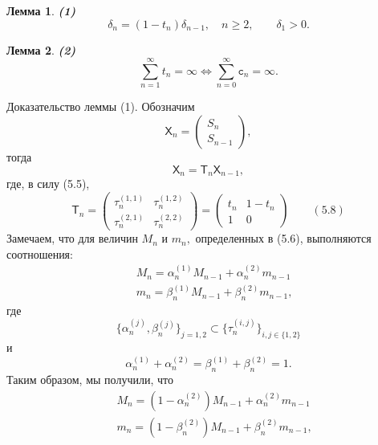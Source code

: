 \documentclass[12 pt, a4 paper]{article}
\theoremstyle{plain}   \newtheorem{Pro}{Задача}
\newtheorem{Lem}{Лемма}
\begin{document}
\begin{Lem}
{\bfseries (1)}
$$
  \delta _n =(1-t_n )\delta _{n-1},
   \quad n \geqslant 2, \qquad \delta _1 >0.
$$
\end{Lem}
\begin{Lem}
{\bfseries (2)}
$$
  \sum _{n=1}^{\infty}t_n =\infty
    \Longleftrightarrow
	  \sum _{n=0}^{\infty} \mathtt{c}_n =\infty .
$$
\end{Lem}
{\Large Доказательство леммы (1).}
Обозначим
\begin{equation*}
  \mathsf{X}_n=
    \begin{pmatrix}
	  S_n \\
	  S_{n-1}
	\end{pmatrix}
 ,
\end{equation*}
тогда
\begin{equation*}
  \mathsf{X}_n =\mathsf{T}_n \mathsf{X}_{n-1},
\end{equation*}
где, в силу (5.5),
\begin{equation*}
  \mathsf{T}_n =
    \begin{pmatrix}
	  \tau _n ^{(1,1)} & \tau _n ^{(1,2)} \\
	  \tau _n ^{(2,1)} & \tau _n ^{(2,2)}
	\end{pmatrix}
  =
    \begin{pmatrix}
	  t_n & 1-t_n \\
	  1 & 0
	\end{pmatrix}
  \qquad (5.8)
\end{equation*}
Замечаем, что для величин
$ M_n $
и
$ m_n , $
определенных в (5.6), выполняются соотношения:
\begin{align*}
  \; & M_n = \alpha _n ^{(1)} M_{n-1}+
    \alpha _n ^{(2)} m_{n-1} \\
  \; & m_n =\beta _n ^{(1)} M_{n-1} +
    \beta _n ^{(2)}m_{n-1},
\end{align*}
где
\begin{equation*}
  \{ \alpha _n ^{(j)} , \beta _n ^{(j)} \} _{j=1,2}
    \subset \{ \tau _n ^{(i,j)} \} _{i,j \in \{ 1,2 \} }
\end{equation*}
и
\begin{equation*}
  \alpha _n ^{(1)} +\alpha _n ^{(2)} =
    \beta _n ^{(1)} + \beta _n ^{(2)} =1 .
\end{equation*}
Таким образом, мы получили, что
\begin{align*}
  \; & M_n =(1-\alpha _n ^{(2)}) M_{n-1}+
     \alpha _n ^{(2)} m_{n-1} \\
  \; & m_n =(1 - \beta _n ^{(2)})M_{n-1}+
    \beta _n ^{(2)} m_{n-1} ,
\end{align*}
\end{document}
